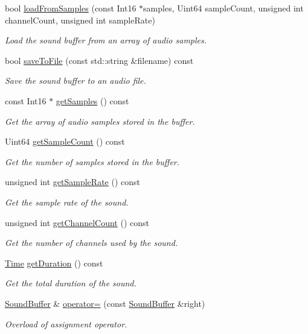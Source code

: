 \begin{DoxyCompactItemize}
bool \hyperlink{classsf_1_1_sound_buffer_a42d51ce4bb3b60c7ea06f63c273fd063}{load\+From\+Samples} (const Int16 $\ast$samples, Uint64 sample\+Count, unsigned int channel\+Count, unsigned int sample\+Rate)
\begin{DoxyCompactList}\small\item\em Load the sound buffer from an array of audio samples. \end{DoxyCompactList}\item 
bool \hyperlink{classsf_1_1_sound_buffer_aade64260c6375580a085314a30be007e}{save\+To\+File} (const std\+::string \&filename) const
\begin{DoxyCompactList}\small\item\em Save the sound buffer to an audio file. \end{DoxyCompactList}\item 
const Int16 $\ast$ \hyperlink{classsf_1_1_sound_buffer_ab9b2525a8da64cb266ba728aff7adecb}{get\+Samples} () const
\begin{DoxyCompactList}\small\item\em Get the array of audio samples stored in the buffer. \end{DoxyCompactList}\item 
Uint64 \hyperlink{classsf_1_1_sound_buffer_aebe2a4bdbfbd9249353748da3f6a4fa1}{get\+Sample\+Count} () const
\begin{DoxyCompactList}\small\item\em Get the number of samples stored in the buffer. \end{DoxyCompactList}\item 
unsigned int \hyperlink{classsf_1_1_sound_buffer_a2c2cf0078ce0549246ecc4a1646212b4}{get\+Sample\+Rate} () const
\begin{DoxyCompactList}\small\item\em Get the sample rate of the sound. \end{DoxyCompactList}\item 
unsigned int \hyperlink{classsf_1_1_sound_buffer_a127707b831d875ed790eef1aa2b9fcc3}{get\+Channel\+Count} () const
\begin{DoxyCompactList}\small\item\em Get the number of channels used by the sound. \end{DoxyCompactList}\item 
\hyperlink{classsf_1_1_time}{Time} \hyperlink{classsf_1_1_sound_buffer_a280a581d9b360fd16121714c51fc8261}{get\+Duration} () const
\begin{DoxyCompactList}\small\item\em Get the total duration of the sound. \end{DoxyCompactList}\item 
\hyperlink{classsf_1_1_sound_buffer}{Sound\+Buffer} \& \hyperlink{classsf_1_1_sound_buffer_adcc786b60bbd95be1551368fafd274a7}{operator=} (const \hyperlink{classsf_1_1_sound_buffer}{Sound\+Buffer} \&right)
\begin{DoxyCompactList}\small\item\em Overload of assignment operator. \end{DoxyCompactList}\end{DoxyCompactItemize}
